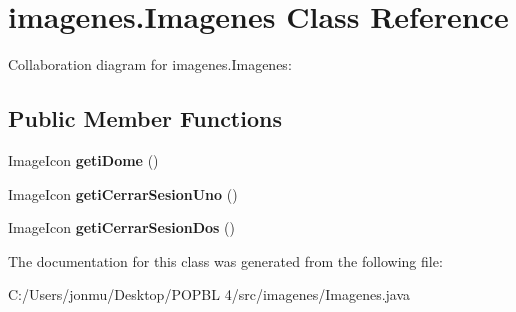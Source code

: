 \hypertarget{classimagenes_1_1_imagenes}{}\section{imagenes.\+Imagenes Class Reference}
\label{classimagenes_1_1_imagenes}


Collaboration diagram for imagenes.\+Imagenes\+:
\subsection*{Public Member Functions}
\begin{DoxyCompactItemize}
\item 
\mbox{\label{classimagenes_1_1_imagenes_a0f0caa5031d91592dd10a958b6b3bca0}} 
Image\+Icon {\bfseries geti\+Dome} ()
\item 
\mbox{\label{classimagenes_1_1_imagenes_a35ea6dc13b089bcc087f73b5f5779219}} 
Image\+Icon {\bfseries geti\+Cerrar\+Sesion\+Uno} ()
\item 
\mbox{\label{classimagenes_1_1_imagenes_a6ba10d5d816cbdf459d769b884940967}} 
Image\+Icon {\bfseries geti\+Cerrar\+Sesion\+Dos} ()
\end{DoxyCompactItemize}


The documentation for this class was generated from the following file\+:\begin{DoxyCompactItemize}
\item 
C\+:/\+Users/jonmu/\+Desktop/\+P\+O\+P\+B\+L 4/src/imagenes/Imagenes.\+java\end{DoxyCompactItemize}
